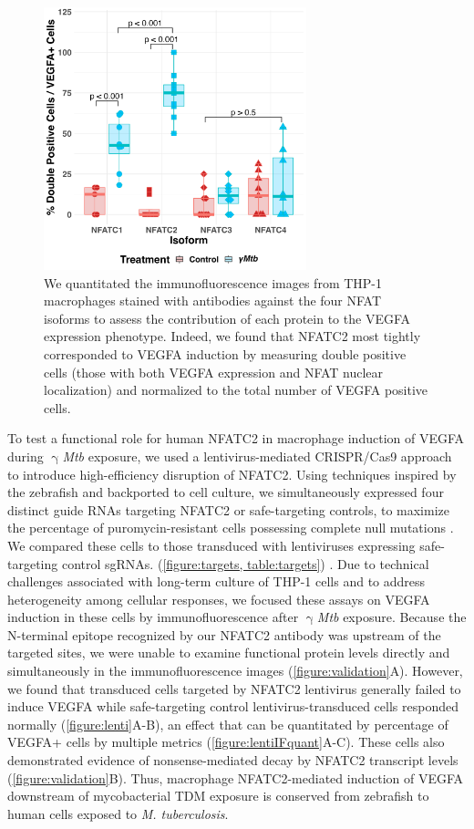 \begin{figure}
\centering
\includegraphics[height=3in]{images/NFAT_isoforms_110222.png}
\caption{We quantitated the immunofluorescence images from THP-1 macrophages stained with antibodies against the four NFAT isoforms to assess the contribution of each protein to the VEGFA expression phenotype. Indeed, we found that NFATC2 most tightly corresponded to VEGFA induction by measuring double positive cells (those with both VEGFA expression and NFAT nuclear localization) and normalized to the total number of VEGFA positive cells.}
\label{figure:isoformsquant}
\end{figure}

To test a functional role for human NFATC2 in macrophage induction of VEGFA during $\upgamma$\textit{Mtb} exposure, we used a lentivirus-mediated CRISPR/Cas9 approach to introduce high-efficiency disruption of NFATC2. Using techniques inspired by the zebrafish and backported to cell culture, we simultaneously expressed four distinct guide RNAs targeting NFATC2 or safe-targeting controls, to maximize the percentage of puromycin-resistant cells possessing complete null mutations \citep{Wu2018}. We compared these cells to those transduced with lentiviruses expressing safe-targeting control sgRNAs. (\autoref{figure:targets, table:targets}) \citep{Kabadi2014, Sanjana2014, Morgens2017, Kitamura2021}. Due to technical challenges associated with long-term culture of THP-1 cells and to address heterogeneity among cellular responses, we focused these assays on VEGFA induction in these cells by immunofluorescence after $\upgamma$\textit{Mtb} exposure. Because the N-terminal epitope recognized by our NFATC2 antibody was upstream of the targeted sites, we were unable to examine functional protein levels directly and simultaneously in the immunofluorescence images (\autoref{figure:validation}A). However, we found that transduced cells targeted by NFATC2 lentivirus generally failed to induce VEGFA while safe-targeting control lentivirus-transduced cells responded normally (\autoref{figure:lenti}A-B), an effect that can be quantitated by percentage of VEGFA+ cells by multiple metrics (\autoref{figure:lentiIFquant}A-C). These cells also demonstrated evidence of nonsense-mediated decay by NFATC2 transcript levels (\autoref{figure:validation}B). Thus, macrophage NFATC2-mediated induction of VEGFA downstream of mycobacterial TDM exposure is conserved from zebrafish to human cells exposed to \textit{M. tuberculosis}.


